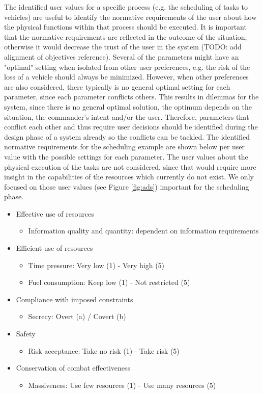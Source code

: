 \documentclass[twoside,twocolumn]{article}
\begin{document}
The identified user values for a specific process (e.g. the scheduling of tasks to vehicles) are useful to identify the normative requirements of the user about how the physical functions within that process should be executed. It is important that the normative requirements are reflected in the outcome of the situation, otherwise it would decrease the trust of the user in the system (TODO: add alignment of objectives reference). Several of the parameters might have an "optimal" setting when isolated from other user preferences, e.g. the risk of the loss of a vehicle should always be minimized. However, when other preferences are also considered, there typically is no general optimal setting for each parameter, since each parameter conflicts others. This results in dilemmas for the system, since there is no general optimal solution, the optimum depends on the situation, the commander's intent and/or the user. Therefore, parameters that conflict each other and thus require user decisions should be identified during the design phase of a system already so the conflicts can be tackled. The identified normative requirements for the scheduling example are shown below per user value with the possible settings for each parameter. The user values about the physical execution of the tasks are not considered, since that would require more insight in the capabilities of the resources which currently do not exist. We only focused on those user values (see Figure \ref{fig:ads}) important for the scheduling phase. 
%
\begin{itemize}
	\item Effective use of resources
		\begin{itemize}
			\item Information quality and quantity: dependent on information requirements
		\end{itemize}
	\item Efficient use of resources
		\begin{itemize}
			\item Time pressure: Very low (1) - Very high (5)
			\item Fuel consumption: Keep low (1) - Not restricted (5)
		\end{itemize}
	\item Compliance with imposed constraints
		\begin{itemize}
			\item Secrecy: Overt (a) / Covert (b)
		\end{itemize}
	\item Safety
		\begin{itemize}
			\item Risk acceptance: Take no risk (1) - Take risk (5)
		\end{itemize}
	\item Conservation of combat effectiveness
		\begin{itemize}
			\item Massiveness: Use few resources (1) - Use many resources (5)
		\end{itemize}
\end{itemize}
\end{document}
